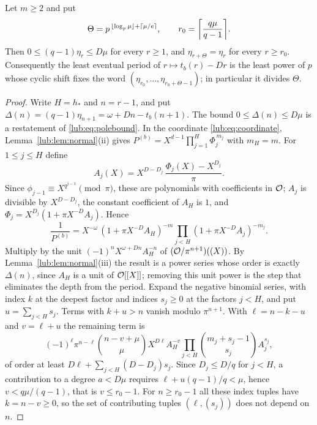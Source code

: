 \begin{theorem}\label{lub:thm:period}
Let $m\ge2$ and put
\[
 \Theta=p^{\,\floor{\log_p\mu}+\ceil{\mu/e}},\qquad
 r_0=\ceil*{\frac{q\mu}{q-1}} .
\]
Then $0\le(q-1)\eta_r\le D\mu$ for every $r\ge1$, and $\eta_{r+\Theta}=\eta_r$ for every
$r\ge r_0$. Consequently the least eventual period of $r\mapsto t_b(r)-Dr$ is the least power
of $p$ whose cyclic shift fixes the word $(\eta_{r_0},\dots,\eta_{r_0+\Theta-1})$; in
particular it divides $\Theta$.
\end{theorem}

\begin{proof}
Write $H=h_*$ and $n=r-1$, and put $\Delta(n)=(q-1)\eta_{n+1}=\omega+Dn-t_b(n+1)$. The bound
$0\le\Delta(n)\le D\mu$ is a restatement of \eqref{lub:eq:polebound}. In the coordinate
\eqref{lub:eq:coordinate}, Lemma~\ref{lub:lem:normal}(ii) gives
$P^{(b)}=X^{d-1}\prod_{j=1}^H\Phi_j^{\,m_j}$ with $m_H=m$. For $1\le j\le H$ define
\[
 A_j(X)=X^{D-D_j}\,\frac{\Phi_j(X)-X^{D_j}}{\pi}.
\]
Since $\phi_{j-1}\equiv X^{q^{j-1}}\pmod\pi$, these are polynomials with coefficients in
$\mathcal{O}$; $A_j$ is divisible by $X^{D-D_j}$, the constant coefficient of $A_H$ is $1$, and
$\Phi_j=X^{D_j}(1+\pi X^{-D}A_j)$. Hence
\[
 \frac1{P^{(b)}}=X^{-\omega}\,(1+\pi X^{-D}A_H)^{-m}\prod_{j<H}(1+\pi X^{-D}A_j)^{-m_j}.
\]
Multiply by the unit $(-1)^nX^{\omega+Dn}A_H^{-n}$ of $(\mathcal{O}/\pi^{n+1})((X))$. By
Lemma~\ref{lub:lem:normal}(iii) the result is a power series whose order is exactly $\Delta(n)$,
since $A_H$ is a unit of $\mathcal{O}[[X]]$; removing this unit power is the step that eliminates the
depth from the period. Expand the negative binomial series, with index $k$ at the deepest
factor and indices $s_j\ge0$ at the factors $j<H$, and put $u=\sum_{j<H}s_j$. Terms with
$k+u>n$ vanish modulo $\pi^{n+1}$. With $\ell=n-k-u$ and $v=\ell+u$ the remaining term is
\[
 (-1)^{\ell}\pi^{n-\ell}\binom{n-v+\mu}{\mu}X^{D\ell}A_H^{-v}
 \prod_{j<H}\binom{m_j+s_j-1}{s_j}A_j^{s_j},
\]
of order at least $D\ell+\sum_{j<H}(D-D_j)s_j$. Since $D_j\le D/q$ for $j<H$, a contribution
to a degree $a<D\mu$ requires $\ell+u(q-1)/q<\mu$, hence $v<q\mu/(q-1)$, that is $v\le
r_0-1$. For $n\ge r_0-1$ all these index tuples have $k=n-v\ge0$, so the set of contributing
tuples $(\ell,(s_j))$ does not depend on $n$.


\end{proof}
